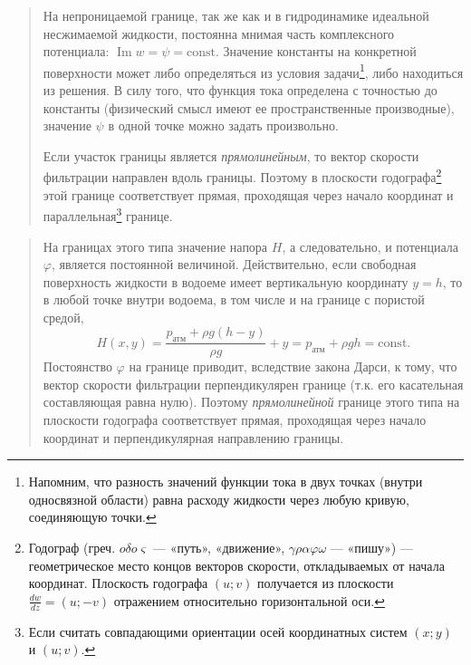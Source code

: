\documentclass[12pt,a4paper]{article}
\newenvironment{textquote}{\begin{quote}\sloppy}{\end{quote}}
\begin{document}
\begin{textquote}
На непроницаемой границе, так же как и в гидродинамике идеальной несжимаемой жидкости, постоянна мнимая часть комплексного потенциала: $\operatorname{Im}w=\psi=\mathrm{const}$. Значение константы на конкретной поверхности может либо определяться из условия задачи\footnote[1]{Напомним, что разность значений функции тока в двух точках (внутри односвязной области) равна расходу жидкости через любую кривую, соединяющую точки.}, либо находиться из решения. В силу того, что функция тока определена с точностью до константы (физический смысл имеют ее пространственные производные), значение $\psi$ в одной точке можно задать произвольно.

Если участок границы является \textit{прямолинейным}, то вектор скорости фильтрации направлен вдоль границы. Поэтому в плоскости годографа\footnote[2]{Годограф (греч. $o\delta o\varsigma$ --- «путь», «движение», $\gamma\rho\alpha\varphi\omega$ --- «пишу») --- геометрическое место концов векторов скорости, откладываемых от начала координат. Плоскость годографа $(u;v)$ получается из плоскости $\frac{dw}{dz}=(u;-v)$ отражением относительно горизонтальной оси.} этой границе соответствует прямая, проходящая через начало координат и параллельная\footnote[3]{Если считать совпадающими ориентации осей координатных систем $(x;y)$ и $(u;v)$.} границе.
\end{textquote}

\begin{textquote}
На границах этого типа значение напора $H$, а следовательно, и потенциала $\varphi$, является постоянной величиной. Действительно, если свободная поверхность жидкости в водоеме имеет вертикальную координату $y=h$, то в любой точке внутри водоема, в том числе и на границе с пористой средой,
\[
H(x,y)=\frac{p_{\text{атм}}+\rho g(h-y)}{\rho g}+y=p_{\text{атм}}+\rho gh=\mathrm{const}.
\]
Постоянство $\varphi$ на границе приводит, вследствие закона Дарси,
к тому, что вектор скорости фильтрации перпендикулярен границе (т.к. его касательная составляющая равна нулю). Поэтому \textit{прямолинейной} границе этого типа на плоскости годографа соответствует прямая, проходящая через начало координат и перпендикулярная направлению границы.
\end{textquote}
\end{document}
